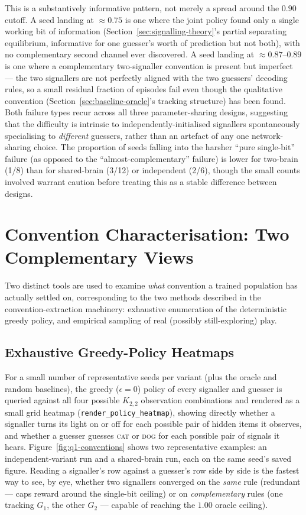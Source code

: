 \documentclass[a4paper,twoside,12pt]{report}
\begin{document}
This is a substantively informative pattern, not merely a spread around the
$0.90$ cutoff. A seed landing at $\approx 0.75$ is one where the joint policy
found only a single working bit of information (Section~\ref{sec:signalling-theory}'s
partial separating equilibrium, informative for one guesser's worth of
prediction but not both), with no complementary second channel ever
discovered. A seed landing at $\approx 0.87$--$0.89$ is one where a
complementary two-signaller convention is present but imperfect --- the two
signallers are not perfectly aligned with the two guessers' decoding rules,
so a small residual fraction of episodes fail even though the qualitative
convention (Section~\ref{sec:baseline-oracle}'s tracking structure) has been
found. Both failure types recur across all three parameter-sharing designs,
suggesting that the difficulty is intrinsic to independently-initialised
signallers spontaneously specialising to \emph{different} guessers, rather
than an artefact of any one network-sharing choice. The proportion of seeds
falling into the harsher ``pure single-bit'' failure (as opposed to the
``almost-complementary'' failure) is lower for two-brain (1/8) than for
shared-brain (3/12) or independent (2/6), though the small counts involved
warrant caution before treating this as a stable difference between designs.

\section{Convention Characterisation: Two Complementary Views}
\label{sec:results-conventions}

Two distinct tools are used to examine \emph{what} convention a trained
population has actually settled on, corresponding to the two methods
described in the convention-extraction machinery: exhaustive enumeration of
the deterministic greedy policy, and empirical sampling of real (possibly
still-exploring) play.

\subsection{Exhaustive Greedy-Policy Heatmaps}

For a small number of representative seeds per variant (plus the oracle and
random baselines), the greedy ($\epsilon = 0$) policy of every signaller and
guesser is queried against all four possible $K_{2,2}$ observation
combinations and rendered as a small grid heatmap
(\texttt{render\_policy\_heatmap}), showing directly whether a signaller
turns its light on or off for each possible pair of hidden items it observes,
and whether a guesser guesses \textsc{cat} or \textsc{dog} for each possible
pair of signals it hears. Figure~\ref{fig:q1-conventions} shows two
representative examples: an independent-variant run and a shared-brain run,
each on the same seed's saved figure. Reading a signaller's row against a
guesser's row side by side is the fastest way to see, by eye, whether two
signallers converged on the \emph{same} rule (redundant --- caps reward
around the single-bit ceiling) or on \emph{complementary} rules (one tracking
$G_1$, the other $G_2$ --- capable of reaching the $1.00$ oracle ceiling).
\end{document}
